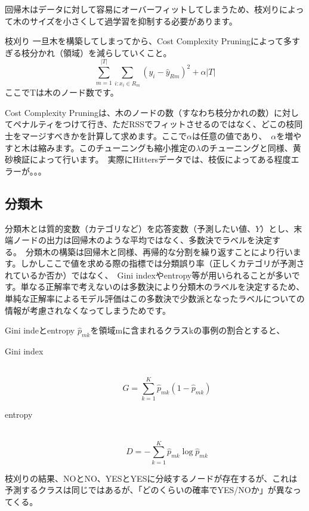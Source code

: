 \documentclass[uplatex]{jsarticle}
\begin{document}
回帰木はデータに対して容易にオーバーフィットしてしまうため、枝刈りによって木のサイズを小さくして過学習を抑制する必要があります。
\begin{itembox}[l]{枝刈り}
  一旦木を構築してしまってから、Cost Complexity Pruningによって多すぎる枝分かれ（領域）を減らしていくこと。\
  $$\sum_{m=1}^{|T|}\sum_{i:x_i \in R_m} (y_i - \hat{y}_{Rm})^2 + \alpha|T|$$
  ここでTは木のノード数です。
\end{itembox}
Cost Complexity Pruningは、木のノードの数（すなわち枝分かれの数）に対してペナルティをつけて行き、ただ{\rm RSS}でフィットさせるのではなく、どこの枝同士をマージすべきかを計算して求めます。ここで$\alpha$は任意の値であり、\
$\alpha$を増やすと木は縮みます。このチューニングも縮小推定の$\lambda$のチューニングと同様、黄砂検証によって行います。\
実際にHittersデータでは、枝仮によってある程度エラーが。。。

\subsection{分類木}
分類木とは質的変数（カテゴリなど）を応答変数（予測したい値、$Y$）とし、末端ノードの出力は回帰木のような平均ではなく、多数決でラベルを決定する。\
分類木の構築は回帰木と同様、再帰的な分割を繰り返すことにより行います。しかしここで値を求める際の指標では分類誤り率（正しくカテゴリが予測されているか否か）ではなく、\
Gini indexやentropy等が用いられることが多いです。単なる正解率で考えないのは多数決により分類木のラベルを決定するため、単純な正解率によるモデル評価はこの多数決で少数派となったラベルについての情報が考慮されなくなってしまうためです。

\begin{itembox}[l]{Gini indeとentropy}
  $\hat{p}_{mk}$を領域mに含まれるクラスkの事例の割合とすると、
  \begin{description}
    \item [Gini index]\mbox{}\\
    $$G = \sum_{k=1}^K\hat{p}_{mk}(1 - \hat{p}_{mk})$$
    \item [entropy]\mbox{}\\
    $$D = -\sum_{k=1}^K \hat{p}_{mk}\log{\hat{p}_{mk}}$$
  \end{description}
\end{itembox}

枝刈りの結果、NOとNO、YESとYESに分岐するノードが存在するが、これは予測するクラスは同じではあるが、「どのくらいの確率でYES/NOか」が異なってくる。
\end{document}
